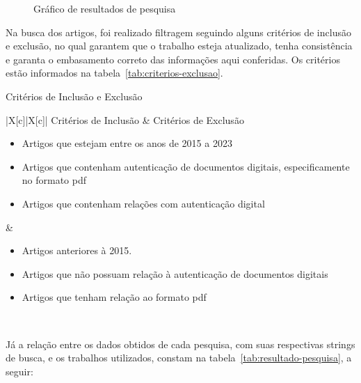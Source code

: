 \begin{figure}[h!]
    \caption[Gráfico de resultados da pesquisa]{Gráfico de resultados de
    pesquisa}
    \sourcesearchfootnote
    \label{fig:grafico-resultados-pesquisa}
\end{figure}
\newpage
Na busca dos artigos, foi realizado filtragem seguindo alguns
critérios de inclusão e exclusão, no qual garantem que o trabalho
esteja atualizado, tenha consistência e garanta o embasamento
correto das informações aqui conferidas.
Os critérios estão informados na tabela~\ref{tab:criterios-exclusao}.
\begin{table}[h]
    \caption[Critérios de Inclusão e Exclusão]{Critérios de Inclusão e Exclusão}
    \begin{tblr}{|X[c]|X[c]|}
        \hline
        Critérios de Inclusão & Critérios de Exclusão \\ \hline
        \begin{itemize}[leftmargin=10px]
            \item Artigos que estejam entre os anos de 2015 a 2023
            \item Artigos que contenham autenticação de documentos digitais,
            especificamente no formato \acrshort{pdf}
            \item Artigos que contenham relações com autenticação digital
        \end{itemize} &
        \begin{itemize}[leftmargin=10px]
            \item Artigos anteriores à 2015.
            \item Artigos que não possuam relação à autenticação de
            documentos digitais
            \item Artigos que tenham relação ao formato \acrshort{pdf}
        \end{itemize} \\ \hline
    \end{tblr}
    \sourcesearchfootnote
    \label{tab:criterios-exclusao}
\end{table}
\newpage

Já a relação entre os dados obtidos de cada pesquisa, com suas
respectivas strings de busca, e os trabalhos utilizados, constam na
tabela~\ref{tab:resultado-pesquisa}, a seguir:

